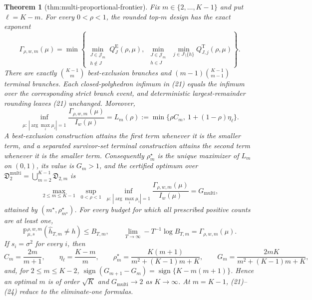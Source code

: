 \documentclass{article}
\newtheorem{theorem}{Theorem}
\begin{document}
\begin{theorem}[thm:multi-proportional-frontier]\label{thm:multi-proportional-frontier}
Fix \(m\in\{2,\ldots,K-1\}\) and put \(\ell=K-m\). For every \(0<\rho<1\), the rounded top-\(m\) design has the exact exponent
\[
 \Gamma_{\rho,w,m}(\mu)=
 \min\left\{
 \min_{\substack{J\in\mathcal J_m\\h\notin J}}Q_J^{\mathrm E}(\rho,\mu),\ 
 \min_{\substack{J\in\mathcal J_m\\h\in J}}\ \min_{j\in J\setminus\{h\}}Q_{J,j}^{\mathrm T}(\rho,\mu)
 \right\}. \tag{21}
\]
There are exactly \(\binom{K-1}{m}\) best-exclusion branches and \((m-1)\binom{K-1}{m-1}\) terminal branches. Each closed-polyhedron infimum in (21) equals the infimum over the corresponding strict branch event, and deterministic largest-remainder rounding leaves (21) unchanged. Moreover,
\[
 \inf_{\mu:\,|\arg\max_i\mu_i|=1}
 \frac{\Gamma_{\rho,w,m}(\mu)}{I_w(\mu)}
 =L_m(\rho):=\min\{\rho C_m,\ 1+(1-\rho)\eta_\ell\}. \tag{22}
\]
A best-exclusion construction attains the first term whenever it is the smaller term, and a separated survivor-set terminal construction attains the second term whenever it is the smaller term. Consequently \(\rho_m^\star\) is the unique maximizer of \(L_m\) on \((0,1)\), its value is \(G_m>1\), and the certified optimum over \(\mathfrak D_2^{\mathrm{multi}}=\bigcup_{m=2}^{K-1}\mathfrak D_{2,m}\) is
\[
 \max_{2\le m\le K-1}\ \sup_{0<\rho<1}\ \inf_{\mu:\,|\arg\max_i\mu_i|=1}
 \frac{\Gamma_{\rho,w,m}(\mu)}{I_w(\mu)}=G_{\mathrm{multi}},
\]
attained by \((m^\star,\rho_{m^\star}^\star)\). For every budget for which all prescribed positive counts are at least one,
\[
 \mathbb P_{\mu,s}^{\rho,w,m}(\widehat h_{T,m}\ne h)\le B_{T,m},
 \qquad
 \lim_{T\to\infty}-T^{-1}\log B_{T,m}=\Gamma_{\rho,w,m}(\mu). \tag{23}
\]
If \(s_i=\sigma^2\) for every \(i\), then
\[
 C_m=\frac{2m}{m+1},\qquad \eta_\ell=\frac{K-m}{m},\qquad
 \rho_m^\star=\frac{K(m+1)}{m^2+(K-1)m+K},\qquad
 G_m=\frac{2mK}{m^2+(K-1)m+K}, \tag{24}
\]
and, for \(2\le m\le K-2\), \(\operatorname{sign}(G_{m+1}-G_m)=\operatorname{sign}\{K-m(m+1)\}\). Hence an optimal \(m\) is of order \(\sqrt K\) and \(G_{\mathrm{multi}}\to2\) as \(K\to\infty\). At \(m=K-1\), (21)--(24) reduce to the eliminate-one formulas.
\end{theorem}
\end{document}

